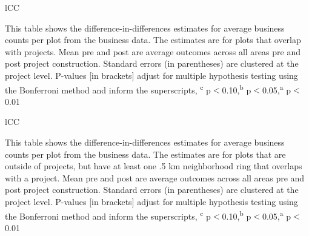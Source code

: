\documentclass[12pt]{article}
\newcommand{\regtextfirst}{
Mean pre and post are average outcomes across all areas pre and post project construction.  Standard errors (in parentheses) are clustered at the project level.  P-values [in brackets] adjust for multiple hypothesis testing using the Bonferroni method and inform the superscripts, \textsuperscript{c} p$<$0.10,\textsuperscript{b} p$<$0.05,\textsuperscript{a} p$<$0.01 \,\,
}
\begin{document}
\clearpage

\begin{table}[ht!]
\small
\centering
\caption{Direct Effects on Economic Outcomes}\label{table:agglom_proj}
\vspace{-2mm}
\begin{threeparttable}
\begin{tabular}{lCC}
\toprule

\bottomrule
\end{tabular}
\begin{tablenotes}
\item \footnotesize 
This table shows the difference-in-differences estimates for average business counts per plot from the business data.  The estimates are for plots that overlap with projects. \regtextfirst
\end{tablenotes}
\end{threeparttable}
\end{table}



\begin{table}[ht!]
\small
\centering
\caption{Spillover Effects on Economic Outcomes}\label{table:agglom_spill}
\vspace{-2mm}
\begin{threeparttable}
\begin{tabular}{lCC}
\toprule

\bottomrule
\end{tabular}
\begin{tablenotes}
\item \footnotesize 
This table shows the difference-in-differences estimates for average business counts per plot from the business data.  The estimates are for plots that are outside of projects, but have at least one .5 km neighborhood ring that overlaps with a project.  \regtextfirst
\end{tablenotes}
\end{threeparttable}
\end{table}
\end{document}
